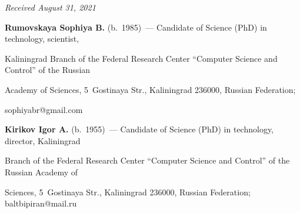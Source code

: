 \hfill{\small\textit{Received August 31, 2021}} 




   

   \Contr

   

   \noindent

   \textbf{Rumovskaya Sophiya B.} (b.\ 1985)~--- Candidate of Science (PhD) in technology, scientist, 

Kaliningrad Branch of the Federal Research Center ``Computer Science and Control'' of the Russian 

Academy of Sciences, 5~Gostinaya Str., Kaliningrad 236000, Russian Federation; 

\mbox{sophiyabr@gmail.com}

   

   \vspace*{3pt}

   

   \noindent

   \textbf{Kirikov Igor A.} (b.\ 1955)~--- Candidate of Science (PhD) in technology, director, Kaliningrad 

Branch of the Federal Research Center ``Computer Science and Control'' of the Russian Academy of 

Sciences, 5~Gostinaya Str., Kaliningrad 236000, Russian Federation; \mbox{baltbipiran@mail.ru}

    

  \label{end\stat}



\renewcommand{\bibname}{\protect\rm Литература} 


